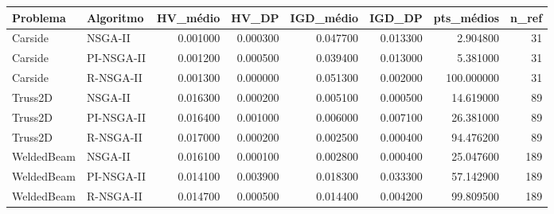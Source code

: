\begin{tabular}{llrrrrrr}
\toprule
Problema & Algoritmo & HV_médio & HV_DP & IGD_médio & IGD_DP & pts_médios & n_ref \\
\midrule
Carside & NSGA-II & 0.001000 & 0.000300 & 0.047700 & 0.013300 & 2.904800 & 31 \\
Carside & PI-NSGA-II & 0.001200 & 0.000500 & 0.039400 & 0.013000 & 5.381000 & 31 \\
Carside & R-NSGA-II & 0.001300 & 0.000000 & 0.051300 & 0.002000 & 100.000000 & 31 \\
Truss2D & NSGA-II & 0.016300 & 0.000200 & 0.005100 & 0.000500 & 14.619000 & 89 \\
Truss2D & PI-NSGA-II & 0.016400 & 0.001000 & 0.006000 & 0.007100 & 26.381000 & 89 \\
Truss2D & R-NSGA-II & 0.017000 & 0.000200 & 0.002500 & 0.000400 & 94.476200 & 89 \\
WeldedBeam & NSGA-II & 0.016100 & 0.000100 & 0.002800 & 0.000400 & 25.047600 & 189 \\
WeldedBeam & PI-NSGA-II & 0.014100 & 0.003900 & 0.018300 & 0.033300 & 57.142900 & 189 \\
WeldedBeam & R-NSGA-II & 0.014700 & 0.000500 & 0.014400 & 0.004200 & 99.809500 & 189 \\
\bottomrule
\end{tabular}
